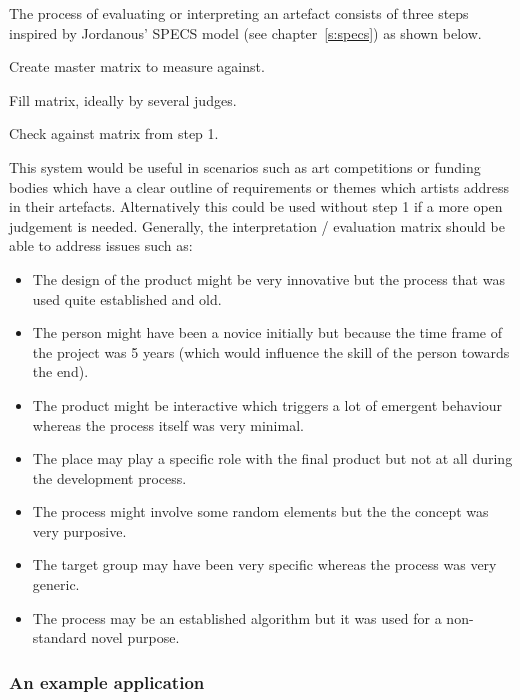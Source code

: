 The process of evaluating or interpreting an artefact consists of three steps inspired by Jordanous' \ac{SPECS} model (see chapter~\ref{s:specs}) as shown below.

\begin{description}[leftmargin=2cm]
  \item[Step 1] Create master matrix to measure against.
  \item[Step 2] Fill matrix, ideally by several judges.
  \item[Step 3] Check against matrix from step 1.
\end{description}

This system would be useful in scenarios such as art competitions or funding bodies which have a clear outline of requirements or themes which artists address in their artefacts. Alternatively this could be used without step 1 if a more open judgement is needed. Generally, the interpretation / evaluation matrix should be able to address issues such as:

\begin{itemize}
  \item The design of the product might be very innovative but the process that was used quite established and old.
  \item The person might have been a novice initially but because the time frame of the project was \num{5} years (which would influence the skill of the person towards the end).
  \item The product might be interactive which triggers a lot of emergent behaviour whereas the process itself was very minimal.
  \item The place may play a specific role with the final product but not at all during the development process.
  \item The process might involve some random elements but the the concept was very purposive.
  \item The target group may have been very specific whereas the process was very generic.
  \item The process may be an established algorithm but it was used for a non-standard novel purpose.
\end{itemize}


\subsubsection{An example application}

